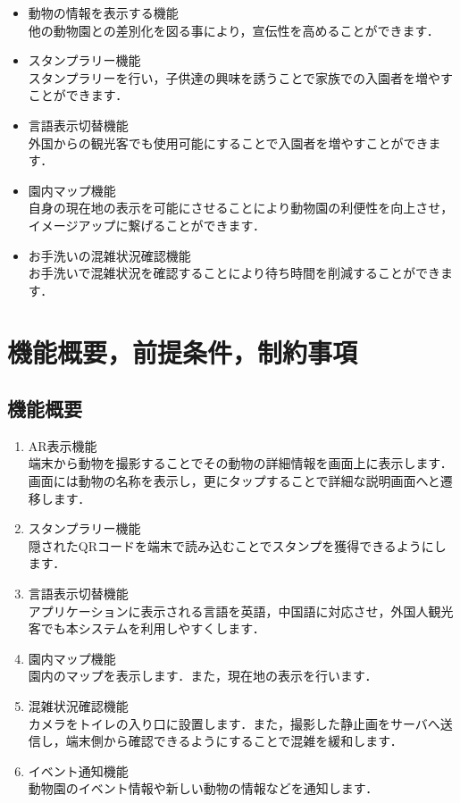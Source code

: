 \documentclass[a4j]{jarticle}
\begin{document}
\begin{itemize}
	\item 動物の情報を表示する機能\\
	他の動物園との差別化を図る事により，宣伝性を高めることができます．
	\item スタンプラリー機能\\
	スタンプラリーを行い，子供達の興味を誘うことで家族での入園者を増やすことができます．
	\item 言語表示切替機能\\
	外国からの観光客でも使用可能にすることで入園者を増やすことができます．
	\item 園内マップ機能\\
	自身の現在地の表示を可能にさせることにより動物園の利便性を向上させ，イメージアップに繋げることができます．
	\item お手洗いの混雑状況確認機能\\
	お手洗いで混雑状況を確認することにより待ち時間を削減することができます．
\end{itemize}


\section{機能概要，前提条件，制約事項}

\subsection{機能概要}
\begin{enumerate}
	\item AR表示機能\\
	端末から動物を撮影することでその動物の詳細情報を画面上に表示します．画面には動物の名称を表示し，更にタップすることで詳細な説明画面へと遷移します．
	\item スタンプラリー機能\\
	隠されたQRコードを端末で読み込むことでスタンプを獲得できるようにします．
	\item 言語表示切替機能\\
	アプリケーションに表示される言語を英語，中国語に対応させ，外国人観光客でも本システムを利用しやすくします．
	\item 園内マップ機能\\
	園内のマップを表示します．また，現在地の表示を行います．
	\item 混雑状況確認機能\\
	カメラをトイレの入り口に設置します．また，撮影した静止画をサーバへ送信し，端末側から確認できるようにすることで混雑を緩和します．
	\item イベント通知機能\\
	動物園のイベント情報や新しい動物の情報などを通知します．
\end{enumerate}
\end{document}
